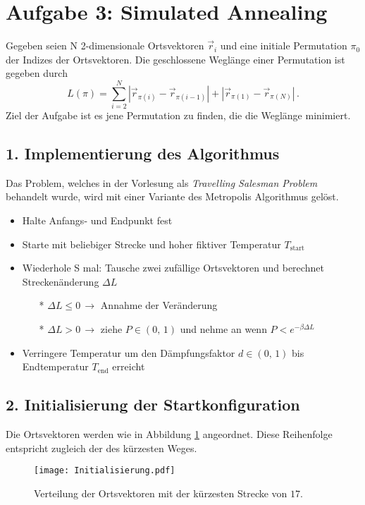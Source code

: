 



\maketitle

\section*{Aufgabe 3: Simulated Annealing}
Gegeben seien N 2-dimensionale Ortsvektoren $\vec{r}_i$ und eine initiale Permutation $\pi_0$ der Indizes der Ortsvektoren.
Die geschlossene Weglänge einer Permutation ist gegeben durch
\begin{equation*}
L(\pi) = \sum_{i=2}^N |\vec{r}_{\pi(i)}-\vec{r}_{\pi(i-1)}| + |\vec{r}_{\pi(1)}-\vec{r}_{\pi(N)}|\, .
\end{equation*}
Ziel der Aufgabe ist es jene Permutation zu finden, die die Weglänge minimiert.

\subsection*{1. Implementierung des Algorithmus}
Das Problem, welches in der Vorlesung als \textit{Travelling Salesman Problem} behandelt wurde, wird mit einer Variante des Metropolis Algorithmus gelöst.
\begin{itemize}
\item Halte Anfangs- und Endpunkt fest
\item Starte mit beliebiger Strecke und hoher fiktiver Temperatur $T_\text{start}$
\item Wiederhole S mal: Tausche zwei zufällige Ortsvektoren und berechnet Streckenänderung $\Delta L$
\begin{itemize}
\item[*] $\Delta L \leq 0 \, \rightarrow$ Annahme der Veränderung
\item[*] $\Delta L > 0 \, \rightarrow$ ziehe $P \in (0,\,1)$ und nehme an wenn $P < e^{-\beta\Delta L}$
\end{itemize}
\item Verringere Temperatur um den Dämpfungsfaktor $d\in (0,\, 1)$ bis Endtemperatur $T_\text{end}$ erreicht
\end{itemize}

\subsection*{2. Initialisierung der Startkonfiguration}
Die Ortsvektoren werden wie in Abbildung \ref{fig:3_1} angeordnet.
Diese Reihenfolge entspricht zugleich der des kürzesten Weges.
\FloatBarrier
\begin{figure}[H]
    \centering
    \texttt{[image: Initialisierung.pdf]}
    \caption{Verteilung der Ortsvektoren mit der kürzesten Strecke von $17$.}
    \label{fig:3_1}
\end{figure}
\FloatBarrier
\noindent


